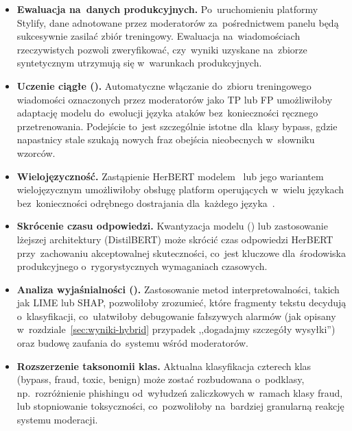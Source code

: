 \begin{itemize}
  \item \textbf{Ewaluacja na~danych produkcyjnych.}
    Po~uruchomieniu platformy Stylify, dane adnotowane przez moderatorów
    za~pośrednictwem panelu będą sukcesywnie zasilać zbiór treningowy.
    Ewaluacja na~wiadomościach rzeczywistych pozwoli zweryfikować,
    czy~wyniki uzyskane na~zbiorze syntetycznym utrzymują się w~warunkach
    produkcyjnych.

  \item \textbf{Uczenie ciągłe ().}
    Automatyczne włączanie do~zbioru treningowego wiadomości oznaczonych
    przez moderatorów jako TP lub FP umożliwiłoby adaptację modelu
    do~ewolucji języka ataków bez~konieczności ręcznego przetrenowania.
    Podejście to~jest szczególnie istotne dla~klasy bypass, gdzie napastnicy
    stale szukają nowych fraz obejścia nieobecnych w~słowniku wzorców.

  \item \textbf{Wielojęzyczność.}
    Zastąpienie HerBERT modelem \xlmr\ lub jego wariantem wielojęzycznym
    umożliwiłoby obsługę platform operujących w~wielu językach bez~konieczności
    odrębnego dostrajania dla~każdego języka~\cite{bib:xlmr}.

  \item \textbf{Skrócenie czasu odpowiedzi.}
    Kwantyzacja modelu () lub zastosowanie
    lżejszej architektury (DistilBERT) może skrócić czas odpowiedzi
    HerBERT przy~zachowaniu akceptowalnej skuteczności, co~jest kluczowe
    dla~środowiska produkcyjnego o~rygorystycznych wymaganiach czasowych.

  \item \textbf{Analiza wyjaśnialności ().}
    Zastosowanie metod interpretowalności, takich jak LIME lub SHAP,
    pozwoliłoby zrozumieć, które fragmenty tekstu decydują o~klasyfikacji,
    co~ułatwiłoby debugowanie fałszywych alarmów (jak opisany
    w~rozdziale~\ref{sec:wyniki-hybrid} przypadek ,,dogadajmy szczegóły
    wysyłki'') oraz budowę zaufania do~systemu wśród moderatorów.

  \item \textbf{Rozszerzenie taksonomii klas.}
    Aktualna klasyfikacja czterech klas (bypass, fraud, toxic, benign)
    może zostać rozbudowana o~podklasy, np.\ rozróżnienie phishingu
    od~wyłudzeń zaliczkowych w~ramach klasy fraud, lub stopniowanie
    toksyczności, co~pozwoliłoby na~bardziej granularną reakcję
    systemu moderacji.
\end{itemize}
